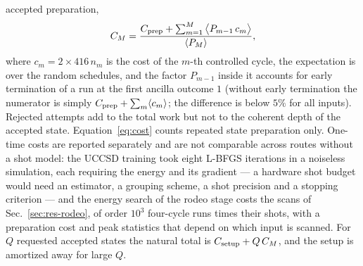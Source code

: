 \documentclass[
  aps,            %
  prc,            %
  reprint,        %
  superscriptaddress,
  floatfix,
  nofootinbib
]{revtex4-2}
\begin{document}
accepted preparation,
\begin{equation}
  C_M=\frac{C_{\rm prep}+\sum_{m=1}^{M}\big\langle P_{m-1}\,c_m\big\rangle}{\langle P_M\rangle},
  \label{eq:cost}
\end{equation}
where $c_m=2\times416\,n_m$ is the cost of the $m$-th controlled cycle, the
expectation is over the random schedules, and the factor $P_{m-1}$ inside it
accounts for early termination of a run at the first ancilla outcome $1$
(without early termination the numerator is simply
$C_{\rm prep}+\sum_m\langle c_m\rangle$; the difference is below $5\%$ for
all inputs).  Rejected attempts add to the total work but not to the
coherent depth of the accepted state.  Equation~\eqref{eq:cost} counts
repeated state preparation only.  One-time costs are reported separately
and are not comparable across routes without a shot model: the UCCSD
training took eight L-BFGS iterations in a noiseless simulation, each
requiring the energy and its gradient --- a hardware shot budget would need
an estimator, a grouping scheme, a shot precision and a stopping criterion
--- and the energy search of the rodeo stage costs the scans of
Sec.~\ref{sec:res-rodeo}, of order $10^{3}$ four-cycle runs times their
shots, with a preparation cost and peak statistics that depend on which
input is scanned.  For $Q$ requested accepted states the natural total is
$C_{\rm setup}+Q\,C_M$, and the setup is amortized away for large $Q$.
\end{document}
